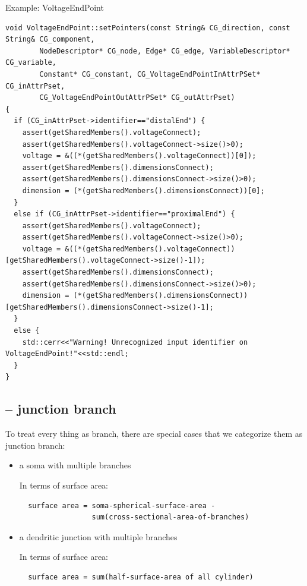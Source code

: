 Example: VoltageEndPoint
\begin{verbatim}
void VoltageEndPoint::setPointers(const String& CG_direction, const String& CG_component, 
        NodeDescriptor* CG_node, Edge* CG_edge, VariableDescriptor* CG_variable, 
        Constant* CG_constant, CG_VoltageEndPointInAttrPSet* CG_inAttrPset, 
        CG_VoltageEndPointOutAttrPSet* CG_outAttrPset) 
{
  if (CG_inAttrPset->identifier=="distalEnd") {
    assert(getSharedMembers().voltageConnect);
    assert(getSharedMembers().voltageConnect->size()>0);    
    voltage = &((*(getSharedMembers().voltageConnect))[0]);
    assert(getSharedMembers().dimensionsConnect);
    assert(getSharedMembers().dimensionsConnect->size()>0);    
    dimension = (*(getSharedMembers().dimensionsConnect))[0];    
  }
  else if (CG_inAttrPset->identifier=="proximalEnd") {
    assert(getSharedMembers().voltageConnect);
    assert(getSharedMembers().voltageConnect->size()>0);    
    voltage = &((*(getSharedMembers().voltageConnect))[getSharedMembers().voltageConnect->size()-1]);
    assert(getSharedMembers().dimensionsConnect);
    assert(getSharedMembers().dimensionsConnect->size()>0);    
    dimension = (*(getSharedMembers().dimensionsConnect))[getSharedMembers().dimensionsConnect->size()-1];
  }
  else {
    std::cerr<<"Warning! Unrecognized input identifier on VoltageEndPoint!"<<std::endl;
  }
}

\end{verbatim}

\subsection{-- junction branch}
\label{sec:junction-branch-neuron}

To treat every thing as branch, there are special cases that we categorize them
as junction branch:
\begin{itemize}
  \item a soma with multiple branches
  
  In terms of surface area:
  \begin{verbatim}
  surface area = soma-spherical-surface-area -
                 sum(cross-sectional-area-of-branches)
  \end{verbatim}
  
  \item a dendritic junction with multiple branches

  In terms of surface area:
  \begin{verbatim}
  surface area = sum(half-surface-area of all cylinder)
  \end{verbatim}
\end{itemize}


